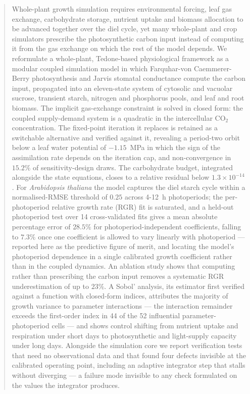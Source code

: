 \documentclass[a4paper,fleqn]{cas-sc}
\begin{document}
\begin{abstract}
Whole-plant growth simulation requires environmental forcing, leaf gas exchange, carbohydrate storage, nutrient uptake and biomass allocation to be advanced together over the diel cycle, yet many whole-plant and crop simulators prescribe the photosynthetic carbon input instead of computing it from the gas exchange on which the rest of the model depends. We reformulate a whole-plant, Tedone-based physiological framework as a modular coupled simulation model in which Farquhar-von Caemmerer-Berry photosynthesis and Jarvis stomatal conductance compute the carbon input, propagated into an eleven-state system of cytosolic and vacuolar sucrose, transient starch, nitrogen and phosphorus pools, and leaf and root biomass. The implicit gas-exchange constraint is solved in closed form: the coupled supply-demand system is a quadratic in the intercellular CO$_2$ concentration. The fixed-point iteration it replaces is retained as a switchable alternative and verified against it, revealing a period-two orbit below a leaf water potential of $-1.15$~MPa in which the sign of the assimilation rate depends on the iteration cap, and non-convergence in $15.2\%$ of sensitivity-design draws. The carbohydrate budget, integrated alongside the state equations, closes to a relative residual below $1.3\times10^{-14}$. For \textit{Arabidopsis thaliana} the model captures the diel starch cycle within a normalised-RMSE threshold of $0.25$ across 4-12~h photoperiods; the per-photoperiod relative growth rate (RGR) fit is saturated, and a held-out photoperiod test over 14 cross-validated fits gives a mean absolute percentage error of $28.5\%$ for photoperiod-independent coefficients, falling to $7.3\%$ once one coefficient is allowed to vary linearly with photoperiod --- reported here as the predictive figure of merit, and locating the model's photoperiod dependence in a single calibrated growth coefficient rather than in the coupled dynamics. An ablation study shows that computing rather than prescribing the carbon input removes a systematic RGR underestimation of up to $23\%$. A Sobol' analysis, its estimator first verified against a function with closed-form indices, attributes the majority of growth variance to parameter interactions --- the interaction remainder exceeds the first-order index in 44 of the 52 influential parameter-photoperiod cells --- and shows control shifting from nutrient uptake and respiration under short days to photosynthetic and light-supply capacity under long days. Alongside the simulation core we report verification tests that need no observational data and that found four defects invisible at the calibrated operating point, including an adaptive integrator step that stalls without diverging --- a failure mode invisible to any check formulated on the values the integrator produces.
\end{abstract}
\end{document}
